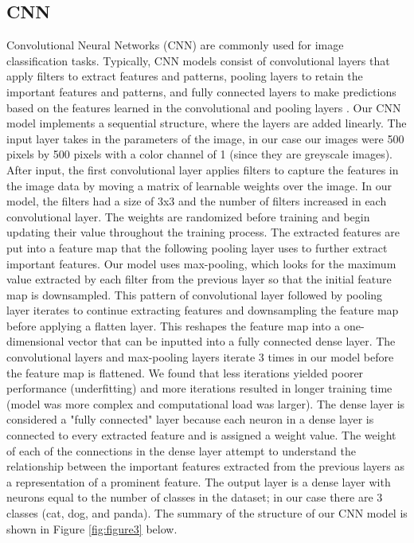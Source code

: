 \subsection{CNN}
Convolutional Neural Networks (CNN) are commonly used for image classification tasks. 
Typically, CNN models consist of convolutional layers that apply filters to extract features and patterns, pooling layers to retain the important features and patterns, and fully connected layers to make predictions based on the features learned in the convolutional and pooling layers \cite{CNNGuide}.
Our CNN model implements a sequential structure, where the layers are added linearly. 
The input layer takes in the parameters of the image, in our case our images were 500 pixels by 500 pixels with a color channel of 1 (since they are greyscale images). 
After input, the first convolutional layer applies filters to capture the features in the image data by moving a matrix of learnable weights over the image. 
In our model, the filters had a size of 3x3 and the number of filters increased in each convolutional layer. 
The weights are randomized before training and begin updating their value throughout the training process. 
The extracted features are put into a feature map that the following pooling layer uses to further extract important features. 
Our model uses max-pooling, which looks for the maximum value extracted by each filter from the previous layer so that the initial feature map is downsampled. 
This pattern of convolutional layer followed by pooling layer iterates to continue extracting features and downsampling the feature map before applying a flatten layer.
This reshapes the feature map into a one-dimensional vector that can be inputted into a fully connected dense layer. 
The convolutional layers and max-pooling layers iterate 3 times in our model before the feature map is flattened. 
We found that less iterations yielded poorer performance (underfitting) and more iterations resulted in longer training time (model was more complex and computational load was larger). 
The dense layer is considered a "fully connected" layer because each neuron in a dense layer is connected to every extracted feature and is assigned a weight value. 
The weight of each of the connections in the dense layer attempt to understand the relationship between the important features extracted from the previous layers as a representation of a prominent feature. 
The output layer is a dense layer with neurons equal to the number of classes in the dataset; in our case there are 3 classes (cat, dog, and panda). 
The summary of the structure of our CNN model is shown in Figure \ref{fig:figure3} below.

